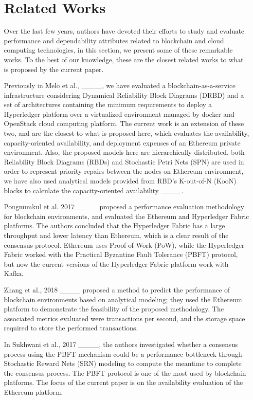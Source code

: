 \section{Related Works}
\label{sec:rltd}
Over the last few years, authors have devoted their efforts to study and evaluate performance and dependability attributes related to blockchain and cloud computing technologies, in this section, we present some of these remarkable works. To the best of our knowledge, these are the closest related works to what is proposed by the current paper.

Previously in Melo et al., ____, we have evaluated a blockchain-as-a-service infrastructure considering Dynamical Reliability Block Diagrams (DRBD) and a set of architectures containing the minimum requirements to deploy a Hyperledger platform over a virtualized environment managed by docker and OpenStack cloud computing platform. The current work is an extension of these two, and are the closest to what is proposed here, which evaluates the availability, capacity-oriented availability, and deployment expenses of an Ethereum private environment. Also, the proposed models here are hierarchically distributed, both Reliability Block Diagrams (RBDs) and Stochastic Petri Nets (SPN) are used in order to represent priority repairs between the nodes on Ethereum environment, we have also used analytical models provided from RBD's K-out-of-N (KooN) blocks to calculate the capacity-oriented availability ____.

Pongnumkul et al. 2017 ____ proposed a performance evaluation methodology for blockchain environments, and evaluated the Ethereum and Hyperledger Fabric platforms. The authors concluded that the Hyperledger Fabric has a large throughput and lower latency than Ethereum, which is a clear result of the consensus protocol. Ethereum uses Proof-of-Work (PoW), while the Hyperledger Fabric worked with the Practical Byzantine Fault Tolerance (PBFT) protocol, but now the current versions of the Hyperledger Fabric platform work with Kafka.

Zhang et al., 2018 ____ proposed a method to predict the performance of blockchain environments based on analytical modeling; they used the Ethereum platform to demonstrate the feasibility of the proposed methodology. The associated metrics evaluated were transactions per second, and the storage space required to store the performed transactions. 

In Sukhwani et al., 2017  ____, the authors investigated whether a consensus process using the PBFT mechanism could be a performance bottleneck through Stochastic Reward Nets (SRN) modeling to compute the meantime to complete the consensus process. The PBFT protocol is one of the most used by blockchain platforms. The focus of the current paper is on the availability evaluation of the Ethereum platform. 

